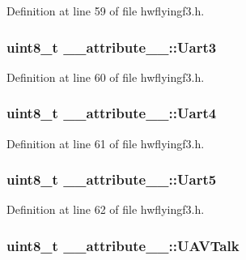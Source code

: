 \-Definition at line 59 of file hwflyingf3.\-h.

\hypertarget{struct____attribute_____a4a32b7af72ea5d381abc138b11db2bdc}{
\subsubsection[{\-Uart3}]{\setlength{\rightskip}{0pt plus 5cm}uint8\-\_\-t {\bf \-\_\-\-\_\-attribute\-\_\-\-\_\-\-::\-Uart3}}}\label{struct____attribute_____a4a32b7af72ea5d381abc138b11db2bdc}


\-Definition at line 60 of file hwflyingf3.\-h.

\hypertarget{struct____attribute_____ac1a298892072ead77a18969c0e567c24}{
\subsubsection[{\-Uart4}]{\setlength{\rightskip}{0pt plus 5cm}uint8\-\_\-t {\bf \-\_\-\-\_\-attribute\-\_\-\-\_\-\-::\-Uart4}}}\label{struct____attribute_____ac1a298892072ead77a18969c0e567c24}


\-Definition at line 61 of file hwflyingf3.\-h.

\hypertarget{struct____attribute_____a50af098d520d3bd7e493d5368612b14f}{
\subsubsection[{\-Uart5}]{\setlength{\rightskip}{0pt plus 5cm}uint8\-\_\-t {\bf \-\_\-\-\_\-attribute\-\_\-\-\_\-\-::\-Uart5}}}\label{struct____attribute_____a50af098d520d3bd7e493d5368612b14f}


\-Definition at line 62 of file hwflyingf3.\-h.

\hypertarget{struct____attribute_____a04645fdb40f84626448ab65edf2c8d7d}{
\subsubsection[{\-U\-A\-V\-Talk}]{\setlength{\rightskip}{0pt plus 5cm}uint8\-\_\-t {\bf \-\_\-\-\_\-attribute\-\_\-\-\_\-\-::\-U\-A\-V\-Talk}}}\label{struct____attribute_____a04645fdb40f84626448ab65edf2c8d7d}


